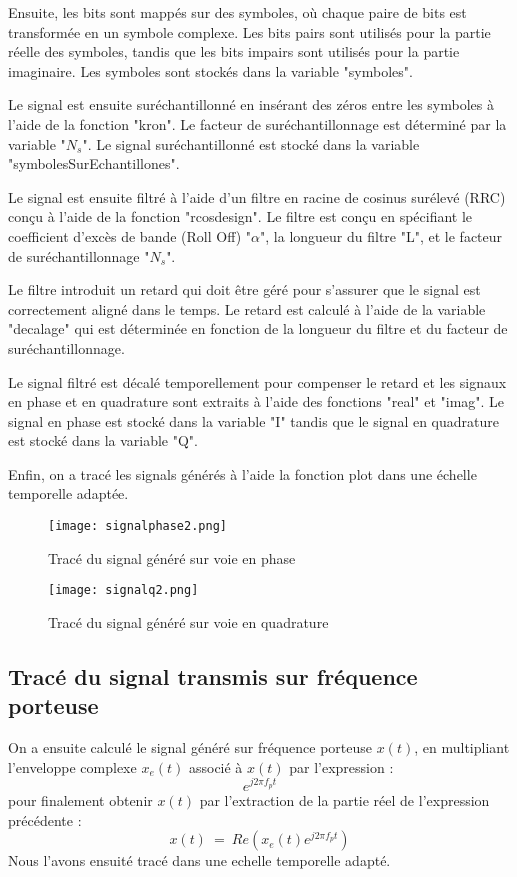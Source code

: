 \documentclass[11pt]{article}
\begin{document}
Ensuite, les bits sont mappés sur des symboles, où chaque paire de bits est transformée en un symbole complexe. Les bits pairs sont utilisés pour la partie réelle des symboles, tandis que les bits impairs sont utilisés pour la partie imaginaire. Les symboles sont stockés dans la variable "symboles".

Le signal est ensuite suréchantillonné en insérant des zéros entre les symboles à l'aide de la fonction "kron". Le facteur de suréchantillonnage est déterminé par la variable "$N_s$". Le signal suréchantillonné est stocké dans la variable "symbolesSurEchantillones".

Le signal est ensuite filtré à l'aide d'un filtre en racine de cosinus surélevé (RRC) conçu à l'aide de la fonction "rcosdesign". Le filtre est conçu en spécifiant le coefficient d'excès de bande (Roll Off) "$\alpha$", la longueur du filtre "L", et le facteur de suréchantillonnage "$N_s$".

Le filtre introduit un retard qui doit être géré pour s'assurer que le signal est correctement aligné dans le temps. Le retard est calculé à l'aide de la variable "decalage" qui est déterminée en fonction de la longueur du filtre et du facteur de suréchantillonnage.

Le signal filtré est décalé temporellement pour compenser le retard et les signaux en phase et en quadrature sont extraits à l'aide des fonctions "real" et "imag". Le signal en phase est stocké dans la variable "I" tandis que le signal en quadrature est stocké dans la variable "Q".

Enfin, on a tracé les signals générés à l'aide la fonction plot dans une échelle temporelle adaptée.\\

\begin{figure}[ht!]
    \centering
    \texttt{[image: signalphase2.png]}
    \caption{Tracé du signal généré sur voie en phase \label{fig : SignalPhase}}
\end{figure}

\begin{figure}[ht!]
    \centering
    \texttt{[image: signalq2.png]}
    \caption{Tracé du signal généré sur voie en quadrature \label{fig : SignalQuadrature}}
\end{figure}

\subsection{Tracé du signal transmis sur fréquence porteuse}
On a ensuite calculé le signal généré sur fréquence porteuse $x(t)$, en multipliant l'enveloppe complexe $x_e(t)$ associé à $x(t)$ par l'expression :
$$e^{j2\pi f_pt}$$
pour finalement obtenir $x(t)$ par l'extraction de la partie réel de l'expression précédente :
$$x(t) \ = \ Re(x_e(t)e^{j2\pi f_pt})$$
Nous l'avons ensuité tracé dans une echelle temporelle adapté.\\
\end{document}
